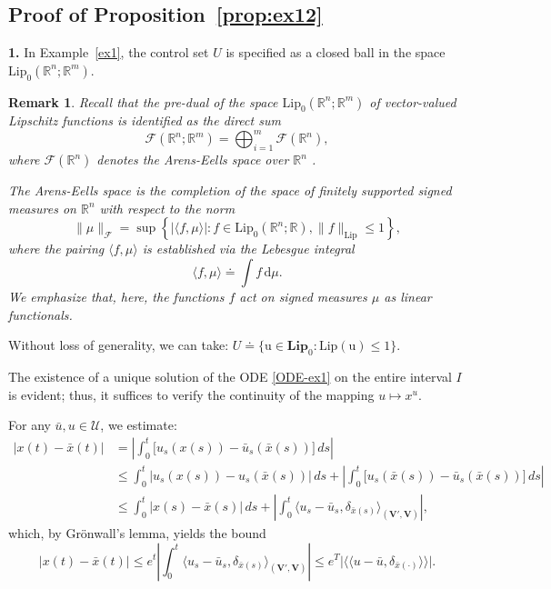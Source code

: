 \documentclass[sn-mathphys-num]{sn-jnl}
\numberwithin{equation}{section}
\theoremstyle{mythm}
\theoremstyle{mydef}
\newtheorem{remark}[proposition]{Remark}
\newcommand{\Lip}{\mathrm{Lip}}
\renewcommand{\d}{\,d}
\newcommand{\R}{\mathbb{R}}
\begin{document}
\subsection{Proof of Proposition~\ref{prop:ex12}}\label{app:proof-ex12}

\textbf{1.} In Example~\ref{ex1}, the control set $U$ is specified as a closed ball in the space \( \text{Lip}_0(\mathbb{R}^n; \mathbb{R}^m) \).

\begin{remark}\label{AES}
Recall that the pre-dual of the space \( \text{Lip}_0(\mathbb{R}^n; \mathbb{R}^m) \) of vector-valued Lipschitz functions is identified as the direct sum
\[
\bm{\mathcal{F}}(\mathbb{R}^n; \mathbb{R}^m) = \bigoplus_{i=1}^m \mathcal{F}(\mathbb{R}^n),
\]
where \( \mathcal{F}(\mathbb{R}^n) \) denotes the Arens-Eells space over \( \mathbb{R}^n \) \cite{Godefroy}.

The Arens-Eells space is  the completion of the space of finitely supported signed measures on \( \mathbb{R}^n \) with respect to the norm
\[
\|\mu\|_{\bm{\mathcal{F}}} = \sup \left\{ \left| \langle f, \mu \rangle \right|: f \in \text{Lip}_0(\mathbb{R}^n; \mathbb{R}), \|f\|_{\text{Lip}} \leq 1 \right\},
\]
where the pairing \( \langle f, \mu \rangle \) is established via the Lebesgue integral
\[
\langle f, \mu \rangle \doteq \int f \, \mathrm{d} \mu.
\]
We emphasize that, here, the functions \( f \) act on signed measures \( \mu \) as linear functionals.
\end{remark}


Without loss of generality, we can take: \( U \doteq \{\mathrm{u} \in \bm{Lip}_0 : \Lip(\mathrm{u}) \leq 1\} \). 

The existence of a unique solution of the ODE \eqref{ODE-ex1} on the entire interval \( I \) is evident; thus, it suffices to verify the continuity of the mapping \( u \mapsto x^u \).

For any \( \bar{u}, u \in \mathcal{U} \), we estimate:
\begin{align*}
    \big|x(t) - \bar{x}(t)\big| &= \left|\int_{0}^t \big[u_s(x(s)) - \bar{u}_s(\bar{x}(s))\big] \d{s}\right| \\
    &\leq \int_{0}^t \big|u_s(x(s)) - u_s(\bar{x}(s))\big| \d{s} + \left|\int_{0}^t \big[u_s(\bar{x}(s)) - \bar{u}_s(\bar{x}(s))\big] \d{s}\right| \\
    &\leq \int_{0}^t \big|x(s) - \bar{x}(s)\big| \d{s} + \left|\int_{0}^t \langle u_s - \bar{u}_s, \delta_{\bar{x}(s)}\rangle_{(\bm{V}', \bm{V})} \right|,
\end{align*}
which, by Gr\"onwall's lemma, yields the bound
\[
    \big|x(t) - \bar{x}(t)\big| \leq e^t \left|\int_{0}^t \langle u_s - \bar{u}_s, \delta_{\bar{x}(s)}\rangle_{(\bm{V}', \bm{V})} \right| \leq e^T \big|\langle\!\langle u - \bar{u}, \delta_{\bar{x}(\cdot)}\rangle\!\rangle\big|.
\]
\end{document}
